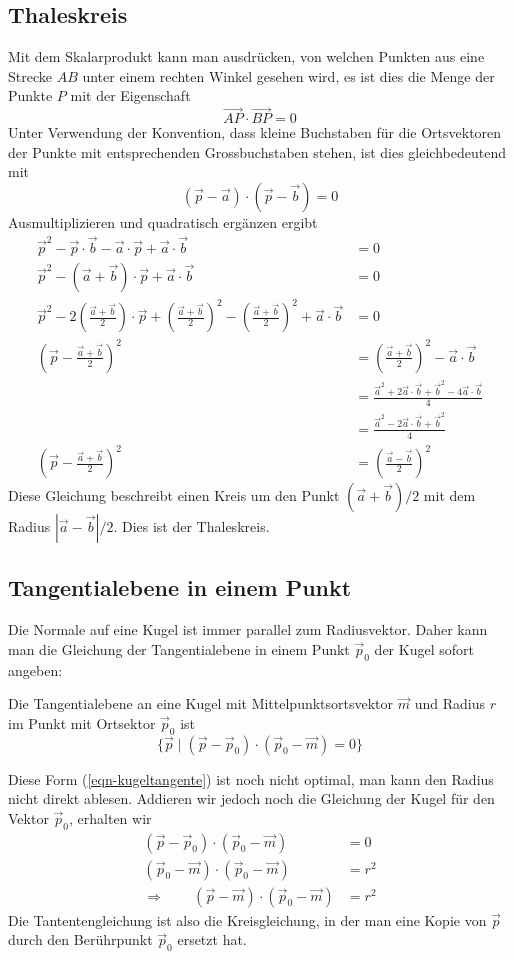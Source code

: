 \subsection{Thaleskreis}
Mit dem Skalarprodukt kann man ausdrücken, von welchen Punkten aus
eine Strecke $AB$ unter einem rechten Winkel gesehen wird, es ist
dies die Menge der Punkte $P$ mit der Eigenschaft
\[
\overrightarrow{AP}\cdot\overrightarrow{BP}=0
\]
Unter Verwendung der Konvention, dass kleine Buchstaben für die
Ortsvektoren der Punkte mit entsprechenden Grossbuchstaben stehen, ist
dies gleichbedeutend mit
\[
(\vec p-\vec a)\cdot(\vec p-\vec b)=0
\]
Ausmultiplizieren und quadratisch ergänzen ergibt
\begin{align*}
\vec p^2-\vec p\cdot\vec b-\vec a\cdot\vec p+\vec a\cdot\vec b&=0
\\
\vec p^2-(\vec a+\vec b)\cdot \vec p+\vec a\cdot\vec b&=0
\\
\vec p^2-2\left(\frac{\vec a+\vec b}{2}\right)\cdot \vec p
+\left(\frac{\vec a+\vec b}{2}\right)^2
-\left(\frac{\vec a+\vec b}{2}\right)^2
+\vec a\cdot\vec b&=0
\\
\left(\vec p
-\frac{\vec a+\vec b}{2}\right)^2&=
\left(\frac{\vec a+\vec b}{2}\right)^2-\vec a\cdot \vec b
\\
&=
\frac{\vec a^2+2\vec a\cdot\vec b+\vec b^2-4\vec a\cdot \vec b}{4}
\\
&=
\frac{\vec a^2-2\vec a\cdot\vec b+\vec b^2}{4}
\\
\left(\vec p
-\frac{\vec a+\vec b}{2}\right)^2&=
\left(\frac{\vec a-\vec b}{2}\right)^2
\end{align*}
Diese Gleichung beschreibt einen Kreis um den Punkt $(\vec a+\vec b)/2$
mit dem Radius $|\vec a-\vec b|/2$.
Dies ist der Thaleskreis.

\subsection{Tangentialebene in einem Punkt}
Die Normale auf eine Kugel ist immer parallel zum Radiusvektor.
Daher kann
man die Gleichung der Tangentialebene in einem Punkt $\vec p_0$ der Kugel
sofort angeben:
\begin{satz}\label{kugeltangentialebene}
Die Tangentialebene an eine Kugel mit Mittelpunktsortsvektor
$\vec m$ und Radius  $r$ im Punkt mit Ortsektor $\vec p_0$ ist
\begin{equation}
\{\vec p\;|\;
(\vec p-\vec p_0)\cdot(\vec p_0-\vec m)=0
\}
\label{eqn-kugeltangente}
\end{equation}
\end{satz}
Diese Form (\ref{eqn-kugeltangente}) ist noch nicht optimal, man kann den
Radius nicht direkt ablesen.
Addieren wir jedoch noch die Gleichung
der Kugel für den Vektor $\vec p_0$, erhalten wir
\begin{align*}
(\vec p-\vec p_0)\cdot(\vec p_0-\vec m)&=0\\
(\vec p_0-\vec m)\cdot(\vec p_0-\vec m)&=r^2\\
\Rightarrow\qquad
(\vec p-\vec m)\cdot(\vec p_0-\vec m)&=r^2
\end{align*}
Die Tantentengleichung ist also die Kreisgleichung, in der man
eine Kopie von $\vec p$ durch den Berührpunkt $\vec p_0$ ersetzt
hat.

